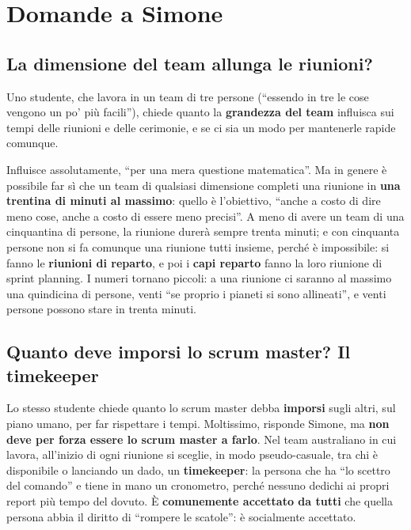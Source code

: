 \section{Domande a Simone}
\label{sec:z3-qa-simone}

\subsection{La dimensione del team allunga le riunioni?}

Uno studente, che lavora in un team di tre persone (``essendo in tre le cose
vengono un po' più facili''), chiede quanto la \textbf{grandezza del team}
influisca sui tempi delle riunioni e delle cerimonie, e se ci sia un modo per
mantenerle rapide comunque.

Influisce assolutamente, ``per una mera questione matematica''. Ma in genere
è possibile far sì che un team di qualsiasi dimensione completi una riunione
in \textbf{una trentina di minuti al massimo}: quello è l'obiettivo, ``anche a
costo di dire meno cose, anche a costo di essere meno precisi''. A meno di
avere un team di una cinquantina di persone, la riunione durerà sempre trenta
minuti; e con cinquanta persone non si fa comunque una riunione tutti insieme,
perché è impossibile: si fanno le \textbf{riunioni di reparto}, e poi i
\textbf{capi reparto} fanno la loro riunione di sprint planning. I numeri
tornano piccoli: a una riunione ci saranno al massimo una quindicina di
persone, venti ``se proprio i pianeti si sono allineati'', e venti persone
possono stare in trenta minuti.

\subsection{Quanto deve imporsi lo scrum master? Il timekeeper}

Lo stesso studente chiede quanto lo scrum master debba \textbf{imporsi} sugli
altri, sul piano umano, per far rispettare i tempi. Moltissimo, risponde
Simone, ma \textbf{non deve per forza essere lo scrum master a farlo}. Nel
team australiano in cui lavora, all'inizio di ogni riunione si sceglie, in
modo pseudo-casuale, tra chi è disponibile o lanciando un dado, un
\textbf{timekeeper}: la persona che ha ``lo scettro del comando'' e tiene in
mano un cronometro, perché nessuno dedichi ai propri report più tempo del
dovuto. È \textbf{comunemente accettato da tutti} che quella persona abbia il
diritto di ``rompere le scatole'': è socialmente accettato.

